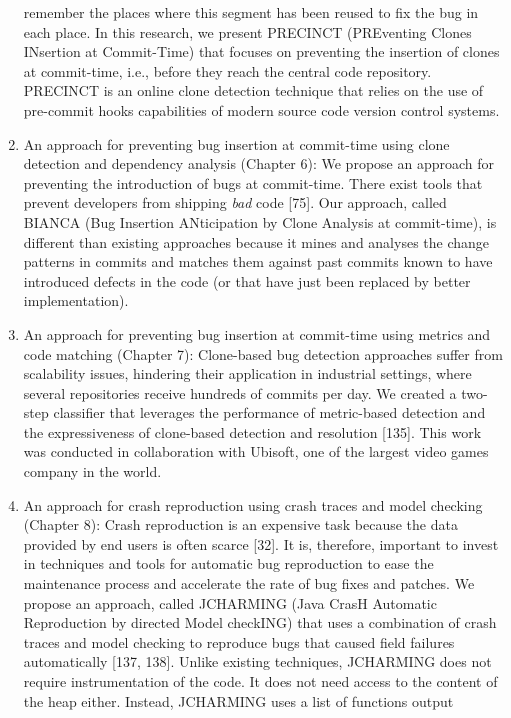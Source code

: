 \documentclass[12pt]{report}
\begin{document}
\begin{enumerate}
  remember the places where this segment has been reused to fix the bug
  in each place. In this research, we present PRECINCT (PREventing
  Clones INsertion at Commit-Time) that focuses on preventing the
  insertion of clones at commit-time, i.e., before they reach the
  central code repository. PRECINCT is an online clone detection
  technique that relies on the use of pre-commit hooks capabilities of
  modern source code version control systems.
\item
  An approach for preventing bug insertion at commit-time using clone
  detection and dependency analysis (Chapter 6): We propose an approach
  for preventing the introduction of bugs at commit-time. There exist tools
  that prevent developers from shipping \emph{bad} code {[}75{]}.
  Our approach, called BIANCA (Bug Insertion ANticipation by Clone
  Analysis at commit-time), is different than existing approaches
  because it mines and analyses the change patterns in commits and
  matches them against past commits known to have introduced defects in
  the code (or that have just been replaced by better implementation).
\item
  An approach for preventing bug insertion at commit-time using metrics
  and code matching (Chapter 7): Clone-based bug detection approaches
  suffer from scalability issues, hindering their application in
  industrial settings, where several repositories receive hundreds of
  commits per day. We created a two-step classifier that leverages the
  performance of metric-based detection and the expressiveness of
  clone-based detection and resolution {[}135{]}. This
  work was conducted in collaboration with Ubisoft, one of the
  largest video games company in the world.
\item
  An approach for crash reproduction using crash traces and model
  checking (Chapter 8): Crash reproduction is an expensive task because
  the data provided by end users is often scarce {[}32{]}. It is,
  therefore, important to invest in techniques and tools for automatic
  bug reproduction to ease the maintenance process and accelerate the
  rate of bug fixes and patches. We propose an approach, called
  JCHARMING (Java CrasH Automatic Reproduction by directed Model
  checkING) that uses a combination of crash traces and model checking
  to reproduce bugs that caused field failures automatically {[}137,
  138{]}. Unlike existing techniques, JCHARMING does not require
  instrumentation of the code. It does not need access to the content of
  the heap either. Instead, JCHARMING uses a list of functions output

\end{enumerate}
\end{document}
